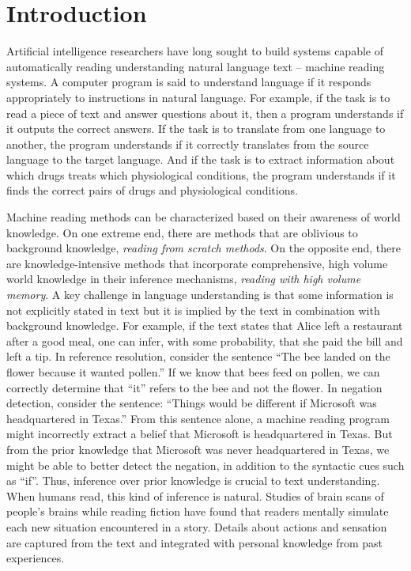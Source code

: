 \documentclass[jair,twoside,11pt,theapa]{article}
\begin{document}
\section{Introduction}
\label{Introduction}
Artificial intelligence  researchers have long sought to build systems capable of automatically reading  understanding  natural language text -- machine reading systems. A computer program is said to understand 
language if it responds appropriately to instructions in natural language. For example, if the task is to read a piece of text and answer questions about it, then a program understands if it outputs the correct answers.  If the task is to translate from one language to another, the program understands if it correctly  translates from the source language to the target language. And if the task is to extract information about which drugs treats which physiological conditions,  the program understands if it finds the correct pairs of drugs and physiological conditions.

Machine reading methods can be characterized based on their awareness of  world knowledge.
On one extreme end, there are methods that  are oblivious to background knowledge, \textit{reading from scratch methods}. On the opposite  end, there are  knowledge-intensive methods that incorporate comprehensive, high volume world knowledge in their inference mechanisms, \textit{reading with high volume memory}. A key challenge in language understanding is that some information is not explicitly stated in text but it is implied by the text in combination with  background knowledge. For example, if the text states that Alice left a restaurant after a good meal, one can infer, with some probability, that she paid the bill and left a tip. In reference resolution, consider the sentence ``The bee landed on the flower because it wanted pollen.''  If we know that  bees feed on pollen, we can correctly determine that ``it''   refers to the bee and not the flower.  In negation detection, consider the sentence:  ``Things would be different if Microsoft was headquartered in Texas.''  From this sentence alone, a machine reading program might incorrectly extract a belief that  Microsoft is headquartered in Texas. But from the prior knowledge that Microsoft was never headquartered in Texas, we might be able to better detect the negation, in addition to the syntactic cues such as ``if''. Thus, inference over prior knowledge is crucial to  text understanding. When humans read, this kind of inference is natural.  Studies of brain scans of people's brains while reading fiction have found that readers mentally simulate each new situation encountered in a story\cite{conf/emnlp/WehbeVKM14}. Details about actions and
sensation are captured from the text and integrated with personal knowledge from past experiences. 
\end{document}

